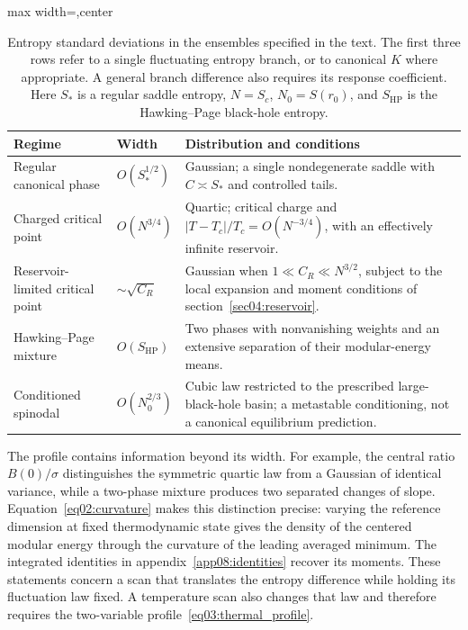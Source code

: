\documentclass[11pt,letterpaper]{article}
\theoremstyle{plain}
\theoremstyle{definition}
\theoremstyle{remark}
\begin{document}
\begin{table}[tbp]
 \centering
 \caption{Entropy standard deviations in the ensembles specified in the text. The first three rows refer to a single fluctuating entropy branch, or to canonical $K$ where appropriate. A general branch difference also requires its response coefficient. Here $S_*$ is a regular saddle entropy, $N=S_c$, $N_0=S(r_0)$, and $S_{\mathrm{HP}}$ is the Hawking--Page black-hole entropy.}
 \label{tab07:regimes}
 \begin{adjustbox}{max width=\textwidth,center}
 \begin{tabular}{p{}p{}p{}}
 \toprule
 Regime & Width & Distribution and conditions \\
 \midrule
 Regular canonical phase & $O(S_*^{1/2})$ & Gaussian; a single nondegenerate saddle with $C\asymp S_*$ and controlled tails. \\[3pt]
 Charged critical point & $O(N^{3/4})$ & Quartic; critical charge and $|T-T_c|/T_c=O(N^{-3/4})$, with an effectively infinite reservoir. \\[3pt]
 Reservoir-limited critical point & $\sim\sqrt{C_R}$ & Gaussian when $1\ll C_R\ll N^{3/2}$, subject to the local expansion and moment conditions of section~\ref{sec04:reservoir}. \\[3pt]
 Hawking--Page mixture & $O(S_{\mathrm{HP}})$ & Two phases with nonvanishing weights and an extensive separation of their modular-energy means. \\[3pt]
 Conditioned spinodal & $O(N_0^{2/3})$ & Cubic law restricted to the prescribed large-black-hole basin; a metastable conditioning, not a canonical equilibrium prediction. \\
 \bottomrule
 \end{tabular}
 \end{adjustbox}
\end{table}

The profile contains information beyond its width. For example, the central ratio $B(0)/\sigma$ distinguishes the symmetric quartic law from a Gaussian of identical variance, while a two-phase mixture produces two separated changes of slope. Equation~\eqref{eq02:curvature} makes this distinction precise: varying the reference dimension at fixed thermodynamic state gives the density of the centered modular energy through the curvature of the leading averaged minimum. The integrated identities in appendix~\ref{app08:identities} recover its moments. These statements concern a scan that translates the entropy difference while holding its fluctuation law fixed. A temperature scan also changes that law and therefore requires the two-variable profile~\eqref{eq03:thermal_profile}.
\end{document}
